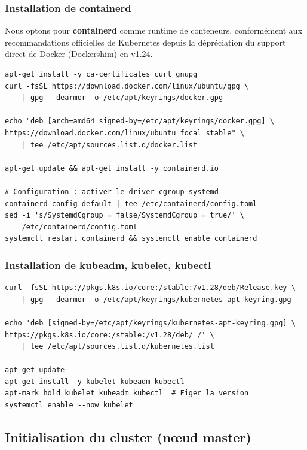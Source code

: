 \documentclass[12pt,a4paper,french]{report}
\newcommand{\kw}[1]{\textbf{#1}}
\begin{document}
\subsubsection{Installation de containerd}

Nous optons pour \kw{containerd} comme runtime de conteneurs, conformément aux recommandations officielles de Kubernetes depuis la dépréciation du support direct de Docker (Dockershim) en v1.24.

\begin{lstlisting}[style=bash, caption={Installation de containerd}]
apt-get install -y ca-certificates curl gnupg
curl -fsSL https://download.docker.com/linux/ubuntu/gpg \
    | gpg --dearmor -o /etc/apt/keyrings/docker.gpg

echo "deb [arch=amd64 signed-by=/etc/apt/keyrings/docker.gpg] \
https://download.docker.com/linux/ubuntu focal stable" \
    | tee /etc/apt/sources.list.d/docker.list

apt-get update && apt-get install -y containerd.io

# Configuration : activer le driver cgroup systemd
containerd config default | tee /etc/containerd/config.toml
sed -i 's/SystemdCgroup = false/SystemdCgroup = true/' \
    /etc/containerd/config.toml
systemctl restart containerd && systemctl enable containerd
\end{lstlisting}

\subsubsection{Installation de kubeadm, kubelet, kubectl}

\begin{lstlisting}[style=bash, caption={Installation des outils Kubernetes 1.28}]
curl -fsSL https://pkgs.k8s.io/core:/stable:/v1.28/deb/Release.key \
    | gpg --dearmor -o /etc/apt/keyrings/kubernetes-apt-keyring.gpg

echo 'deb [signed-by=/etc/apt/keyrings/kubernetes-apt-keyring.gpg] \
https://pkgs.k8s.io/core:/stable:/v1.28/deb/ /' \
    | tee /etc/apt/sources.list.d/kubernetes.list

apt-get update
apt-get install -y kubelet kubeadm kubectl
apt-mark hold kubelet kubeadm kubectl  # Figer la version
systemctl enable --now kubelet
\end{lstlisting}

\subsection{Initialisation du cluster (nœud master)}
\end{document}
